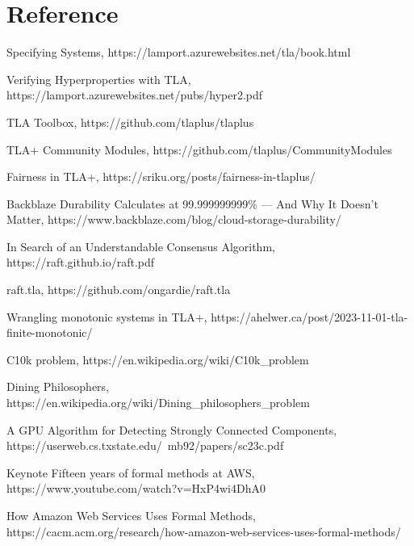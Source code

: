 \chapter{Reference}

\begin{thebibliography}{9}

Specifying Systems, 
https://lamport.azurewebsites.net/tla/book.html

Verifying Hyperproperties with TLA,
https://lamport.azurewebsites.net/pubs/hyper2.pdf

TLA Toolbox,
https://github.com/tlaplus/tlaplus

TLA+ Community Modules,
https://github.com/tlaplus/CommunityModules

\bibitem{}
Fairness in TLA+,
https://sriku.org/posts/fairness-in-tlaplus/

Backblaze Durability Calculates at 99.999999999\% — And Why It Doesn’t Matter,
https://www.backblaze.com/blog/cloud-storage-durability/

In Search of an Understandable Consensus Algorithm,
https://raft.github.io/raft.pdf

raft.tla,
https://github.com/ongardie/raft.tla

Wrangling monotonic systems in TLA+,
https://ahelwer.ca/post/2023-11-01-tla-finite-monotonic/

C10k problem,
https://en.wikipedia.org/wiki/C10k\_problem

Dining Philosophers,
https://en.wikipedia.org/wiki/Dining\_philosophers\_problem

A GPU Algorithm for Detecting Strongly Connected Components,
https://userweb.cs.txstate.edu/~mb92/papers/sc23c.pdf

\bibitem{}
Keynote Fifteen years of formal methods at AWS,
https://www.youtube.com/watch?v=HxP4wi4DhA0

How Amazon Web Services Uses Formal Methods,
https://cacm.acm.org/research/how-amazon-web-services-uses-formal-methods/

\end{thebibliography}


